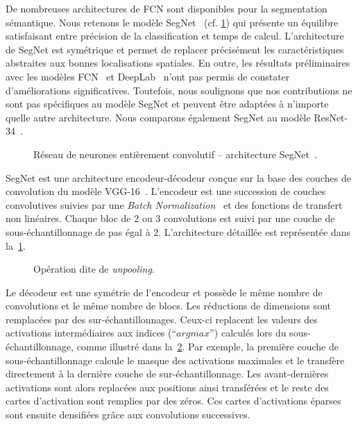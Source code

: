 
De nombreuses architectures de \gls{FCN} sont disponibles pour la segmentation sémantique. Nous retenons le modèle SegNet~\cite{badrinarayanan_segnet_2017} (cf. \cref{fig:segnet}) qui présente un équilibre satisfaisant entre précision de la classification et temps de calcul. L'architecture de SegNet est symétrique et permet de replacer précisément les caractéristiques abstraites aux bonnes localisations spatiales. En outre, les résultats préliminaires avec les modèles \gls{FCN}~\cite{long_fully_2015} et DeepLab~\cite{l._c._chen_deeplab_2018} n'ont pas permis de constater d'améliorations significatives. Toutefois, nous soulignons que nos contributions ne sont pas spécifiques au modèle SegNet et peuvent être adaptées à n'importe quelle autre architecture. Nous comparons également SegNet au modèle ResNet-34~\cite{he_deep_2016}.

\begin{figure}
	\resizebox{\textwidth}{!}{%
	
	}
	\caption{Réseau de neurones entièrement convolutif -- architecture SegNet~\cite{badrinarayanan_segnet_2017}.}
	\label{fig:segnet}
\end{figure}

SegNet est une architecture encodeur-décodeur conçue sur la base des couches de convolution du modèle VGG-16~\cite{chatfield_return_2014,simonyan_very_2014}. L'encodeur est une succession de couches convolutives suivies par une \emph{Batch Normalization}~\cite{ioffe_batch_2015} et des fonctions de transfert non linéaires. Chaque bloc de 2 ou 3 convolutions est suivi par une couche de sous-échantillonnage de pas égal à 2. L'architecture détaillée est représentée dans la~\cref{fig:segnet}.

\begin{figure}

\caption{Opération dite de \emph{unpooling}.}
\label{fig:unpooling}
\end{figure}

Le décodeur est une symétrie de l'encodeur et possède le même nombre de convolutions et le même nombre de blocs. Les réductions de dimensions sont remplacées par des sur-échantillonnages. Ceux-ci replacent les valeurs des activations intermédiaires aux indices (``$argmax$'') calculés lors du sous-échantillonnage, comme illustré dans la~\cref{fig:unpooling}. Par exemple, la première couche de sous-échantillonnage calcule le masque des activations maximales et le transfère directement à la dernière couche de sur-échantillonnage. Les avant-dernières activations sont alors replacées aux positions ainsi transférées et le reste des cartes d'activation sont remplies par des zéros. Ces cartes d'activations éparses sont ensuite densifiées grâce aux convolutions successives.

